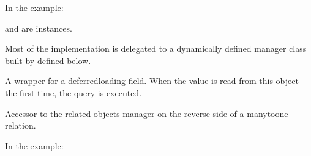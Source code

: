\documentclass[letterpaper,10pt,english,openany,oneside]{sphinxmanual}
\begin{document}
\begin{fulllineitems}
\begin{fulllineitems}
In the example:

\begin{sphinxVerbatim}[commandchars=\\\{\}]
 
       
\end{sphinxVerbatim}

 and  are 
instances.

Most of the implementation is delegated to a dynamically defined manager
class built by  defined below.

\end{fulllineitems}


\begin{fulllineitems}
\label{\detokenize{modules/models:users.models.CustomUser.id}}
A wrapper for a deferred\sphinxhyphen{}loading field. When the value is read from this
object the first time, the query is executed.

\end{fulllineitems}


\begin{fulllineitems}
\label{\detokenize{modules/models:users.models.CustomUser.logentry_set}}
Accessor to the related objects manager on the reverse side of a
many\sphinxhyphen{}to\sphinxhyphen{}one relation.

In the example:

\begin{sphinxVerbatim}[commandchars=\\\{\}]
 
       
\end{sphinxVerbatim}


\end{fulllineitems}
\end{fulllineitems}
\end{document}
